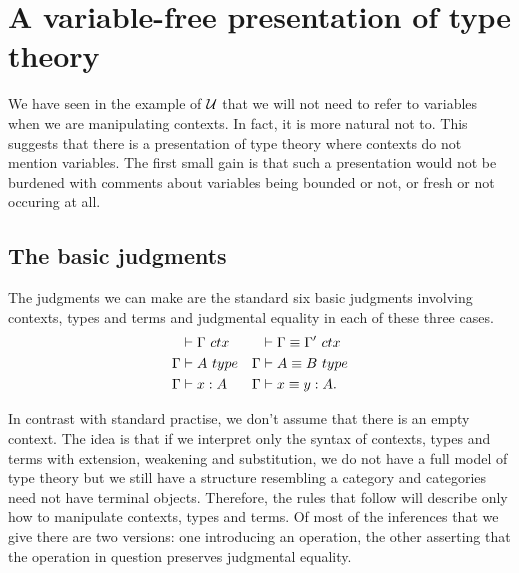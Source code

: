 \section{A variable-free presentation of type theory}
We have seen in the example of $\mathcal{U}$ that we will not need to refer to variables
when we are manipulating contexts. In fact, it is more natural not to.
This suggests that there is a presentation
of type theory where contexts do not mention variables. The first small gain is that such a presentation
would not be burdened with comments about variables being bounded or not, or fresh or
not occuring at all.

\subsection{The basic judgments}
The judgments we can make are the standard six basic judgments involving contexts, types and terms and
judgmental equality in each of these three cases.
\begin{align*}
\jctx*{\Gamma} & \jctxeq*{\Gamma}{\Gamma'}\\
\jtype*{\Gamma}{A} & \jtypeeq*{\Gamma}{A}{B}\\
\jterm*{\Gamma}{A}{x} & \jtermeq*{\Gamma}{A}{x}{y}.
\end{align*}

In contrast with standard practise, we don't assume that there is an empty context. The idea is that
if we interpret only the syntax of contexts, types and terms with extension, weakening and
substitution, we do not have a full model of type theory but we still have a 
structure resembling a category and categories need not have terminal objects. Therefore,
the rules that follow will describe only how to manipulate contexts, types and terms.
Of most of the inferences that we give there are two versions: one introducing an operation, the other asserting that the operation in question preserves judgmental equality. 

